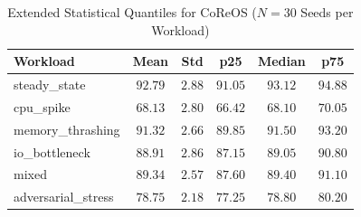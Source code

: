 \documentclass[conference]{IEEEtran}
\begin{document}
\begin{table}[!h]
\caption{Extended Statistical Quantiles for CoReOS ($N=30$ Seeds per Workload)}
\label{tab:extended_stats}
\centering
\footnotesize
\begin{tabularx}{\columnwidth}{lccccc}
\toprule
\textbf{Workload} & \textbf{Mean} & \textbf{Std} & \textbf{p25} & \textbf{Median} & \textbf{p75} \\
\midrule
steady\_state & $92.79$ & $2.88$ & $91.05$ & $93.12$ & $94.88$ \\
cpu\_spike & $68.13$ & $2.80$ & $66.42$ & $68.10$ & $70.05$ \\
memory\_thrashing & $91.32$ & $2.66$ & $89.85$ & $91.50$ & $93.20$ \\
io\_bottleneck & $88.91$ & $2.86$ & $87.15$ & $89.05$ & $90.80$ \\
mixed & $89.34$ & $2.57$ & $87.60$ & $89.40$ & $91.10$ \\
adversarial\_stress & $78.75$ & $2.18$ & $77.25$ & $78.80$ & $80.20$ \\
\bottomrule
\end{tabularx}
\end{table}
\end{document}
